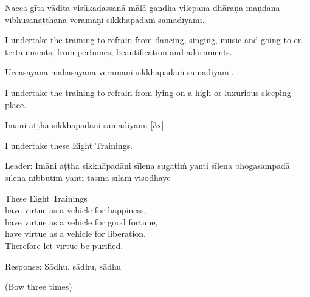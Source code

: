 Nacca-gīta-vādita-visūkadassanā mālā-gandha-vilepana-dhāraṇa-maṇḍana-vibhūsanaṭṭhānā veramaṇi-sikkhāpadaṁ samādiyāmi.\\

\begin{english}
  I undertake the training to refrain from dancing, singing, music and going to entertainments; from perfumes, beautification and adornments.\hyperlink{endnote140-appendix}{\hypertarget{endnote140-body}{}}\\
  \end{english}

Uccāsayana-mahāsayanā veramaṇi-sikkhāpadaṁ samādiyāmi.\\

\begin{english}
  I undertake the training to refrain from lying on a high or luxurious sleeping place.\\
\end{english}

Imāni aṭṭha sikkhāpadāni samādiyāmi \hfill{[3x]}\\

\begin{english}
  I undertake these Eight Trainings.\\
\end{english}

Leader: Imāni aṭṭha sikkhāpadāni sīlena sugatiṁ yanti sīlena bhogasampadā sīlena nibbutiṁ yanti tasmā sīlaṁ visodhaye\\

\begin{english}
  These Eight Trainings\\
  have virtue as a vehicle for happiness,\\
  have virtue as a vehicle for good fortune,\\
  have virtue as a vehicle for liberation.\\
  Therefore let virtue be purified.\hyperlink{endnote141-appendix}{\hypertarget{endnote141-body}{}}\\
  \end{english}

Response: Sādhu, sādhu, sādhu\\

\begin{center}
  (Bow three times)\\
\end{center}
